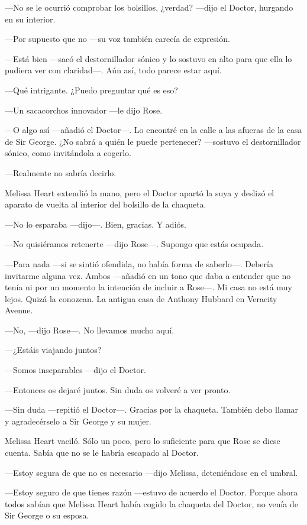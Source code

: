 {---No se le ocurrió comprobar los bolsillos, ¿verdad? ---dijo el
Doctor, hurgando en su interior.}

{---Por supuesto que no ---su voz también carecía de expresión.}

{---Está bien ---sacó el destornillador sónico y lo sostuvo en alto para
	que ella lo pudiera ver con claridad---. Aún así, todo parece estar
aquí.}

{---Qué intrigante. ¿Puedo preguntar qué es eso?}

{---Un sacacorchos innovador ---le dijo Rose.}

{---O algo así ---añadió el Doctor---. Lo encontré en la calle a las
	afueras de la casa de Sir George. ¿No sabrá a quién le puede pertenecer?
---sostuvo el destornillador sónico, como invitándola a cogerlo.}

{---Realmente no sabría decirlo.}

{Melissa Heart extendió la mano, pero el Doctor apartó la suya y deslizó
el aparato de vuelta al interior del bolsillo de la chaqueta.}

{---No lo esparaba ---dijo---. Bien, gracias. Y adiós.}

{---No quisiéramos retenerte ---dijo Rose---. Supongo que estás
ocupada.}

{---Para nada ---si se sintió ofendida, no había forma de saberlo---.
	Debería invitarme alguna vez. Ambos ---añadió en un tono que daba a
	entender que no tenía ni por un momento la intención de incluir a
	Rose---. Mi casa no está muy lejos. Quizá la conozcan. La antigua casa
de Anthony Hubbard en Veracity Avenue.}

{---No, ---dijo Rose---. No llevamos mucho aquí.}

{---¿Estáis viajando juntos?}

{---Somos inseparables ---dijo el Doctor.}

{---Entonces os dejaré juntos. Sin duda os volveré a ver pronto.}

{---Sin duda ---repitió el Doctor---. Gracias por la chaqueta. También
debo llamar y agradecérselo a Sir George y su mujer.}

{Melissa Heart vaciló. Sólo un poco, pero lo suficiente para que Rose se
diese cuenta. Sabía que no se le habría escapado al Doctor.}

{---Estoy segura de que no es necesario ---dijo Melissa, deteniéndose en
el umbral.}

{---Estoy seguro de que tienes razón ---estuvo de acuerdo el Doctor.
	Porque ahora todos sabían que Melissa Heart había cogido la chaqueta del
Doctor, no venía de Sir George o su esposa.}

